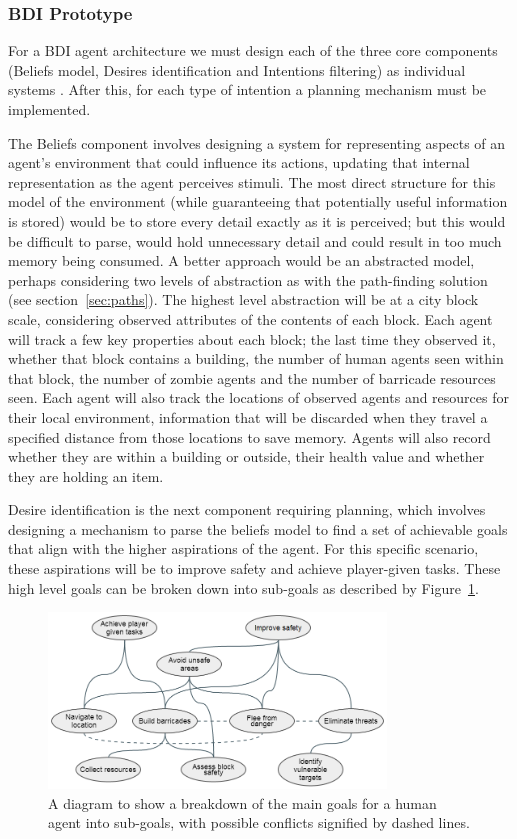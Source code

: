 \documentclass[12pt,a4paper]{article}
\begin{document}
\subsubsection{BDI Prototype}\noindent
For a BDI agent architecture we must design each of the three core components (Beliefs model, Desires identification and Intentions filtering) as individual systems \cite{rao95}. After this, for each type of intention a planning mechanism must be implemented.

The Beliefs component involves designing a system for representing aspects of an agent's environment that could influence its actions, updating that internal representation as the agent perceives stimuli. The most direct structure for this model of the environment (while guaranteeing that potentially useful information is stored) would be to store every detail exactly as it is perceived; but this would be difficult to parse, would hold unnecessary detail and could result in too much memory being consumed. A better approach would be an abstracted model, perhaps considering two levels of abstraction as with the path-finding solution (see section~\ref{sec:paths}). The highest level abstraction will be at a city block scale, considering observed attributes of the contents of each block. Each agent will track a few key properties about each block; the last time they observed it, whether that block contains a building, the number of human agents seen within that block, the number of zombie agents and the number of barricade resources seen. Each agent will also track the locations of observed agents and resources for their local environment, information that will be discarded when they travel a specified distance from those locations to save memory. Agents will also record whether they are within a building or outside, their health value and whether they are holding an item.

Desire identification is the next component requiring planning, which involves designing a mechanism to parse the beliefs model to find a set of achievable goals that align with the higher aspirations of the agent. For this specific scenario, these aspirations will be to improve safety and achieve player-given tasks. These high level goals can be broken down into sub-goals as described by Figure~\ref{fig:goals}.

\label{sec:bdi}
\begin{figure}[h]
\centering
\includegraphics[width=0.8\textwidth]{goals}
\caption{A diagram to show a breakdown of the main goals for a human agent into sub-goals, with possible conflicts signified by dashed lines.}
\label{fig:goals}
\end{figure}
\end{document}
